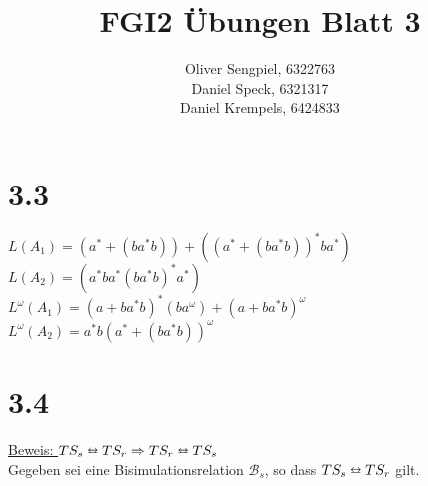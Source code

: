 \documentclass{article}
\title{FGI2 Übungen Blatt 3}
\author{Oliver Sengpiel, 6322763 \\ Daniel Speck, 6321317 \\ Daniel
Krempels, 6424833}
\begin{document}
\maketitle

\section*{3.3}
$L(A_1) = (a^* + (ba^*b)) + ((a^* + (ba^*b))^* ba^*)$ \\
$L(A_2) = (a^*ba^*(ba^*b)^*a^*)$ \\
$L^\omega(A_1) = (a + ba^*b)^*(ba^\omega) + (a + ba^*b)^\omega$ \\
$L^\omega(A_2) = a^*b(a^* + (ba^*b))^\omega$ \\

\section*{3.4}
\underline{Beweis: $TS_s \leftrightarroweq TS_r \Rightarrow TS_r
\leftrightarroweq TS_s$}\\
Gegeben sei eine Bisimulationsrelation $\mathcal{B}_s$, so dass $TS_s
\leftrightarroweq TS_r$ gilt.
\end{document}
